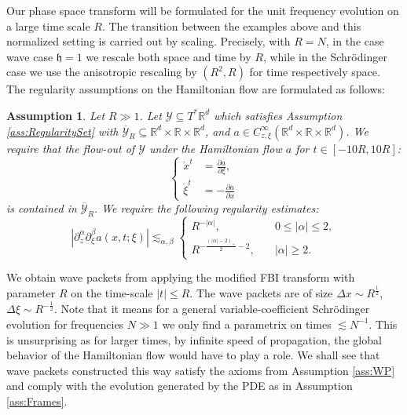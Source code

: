 \documentclass{amsart}
\newtheorem{assumption}[theorem]{Assumption}
\theoremstyle{definition}
\newcommand{\R}{\mathbb{R}}
\begin{document}
Our phase space transform will be formulated for the unit frequency evolution on a large time scale $R$. The transition between the examples above and this normalized setting is carried out by scaling. Precisely, with $R=N$, in the case wave case $\mathfrak{h} = 1$ we rescale both space and time by $R$, while in the Schr\"odinger case we use the anisotropic rescaling by $(R^2,R)$ for time respectively space. 
The regularity assumptions on the Hamiltonian flow are formulated as follows:
\begin{assumption}
    \label{ass:HamiltonianFlowRegularity}
    Let $R \gg 1$. Let $\mathcal{Y} \subseteq T^* \R^d$ which satisfies Assumption \ref{ass:RegularitySet} with $\overline{\mathcal{Y}}_R \subseteq \R^d \times \R \times \R^d$, and $a \in C^\infty_{z,\xi}(\R^d \times \R \times \R^d)$. We require that the flow-out of $\mathcal{Y}$ under the Hamiltonian flow $a$ for $t \in [-10R,10R]$:
    \begin{equation*}
        \left\{ \begin{array}{cl}
             \dot{x}^t &= \frac{\partial a}{\partial \xi}, \\
             \dot{\xi}^t &= - \frac{\partial a}{\partial x}
        \end{array} \right.
    \end{equation*}
    is contained in $\overline{\mathcal{Y}}_R$. We require the following regularity estimates:
    \begin{equation}
        \label{eq:RegularityEstimatesHamiltonianFlowAssumption}
        |\partial_z^{\alpha} \partial_{\xi}^{\beta} a(x,t;\xi)| \lesssim_{\alpha,\beta} \begin{cases}
            R^{-|\alpha|}, &\quad 0 \leq |\alpha| \leq 2, \\
            R^{- \frac{(|\alpha|-2)_+}{2}-2}, &\quad |\alpha| \geq 2.
        \end{cases}
    \end{equation}
\end{assumption}

We obtain wave packets from applying the modified FBI transform with parameter $R$ on the time-scale $|t| \leq R$. The wave packets are of size $\Delta x \sim R^{\frac{1}{2}}$, $\Delta \xi \sim R^{-\frac{1}{2}}$. 
Note that it means for a general variable-coefficient Schr\"odinger evolution for frequencies $N \gg 1$ we only find a parametrix on times $\lesssim N^{-1}$. This is unsurprising as for larger times, by infinite speed of propagation, the global behavior of the Hamiltonian flow would have to play a role. We shall see that wave packets constructed this way satisfy the axioms from Assumption \ref{ass:WP} and comply with the evolution generated by the PDE as in Assumption \ref{ass:Frames}.
\end{document}
